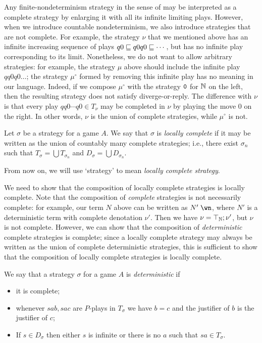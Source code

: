 \documentclass[sigplan,9pt,review]{acmart}\settopmatter{printfolios=true,printccs=false,printacmref=false}
\begin{document}
Any finite-nondeterminism strategy in the sense of \cite{mcCHFiniteND} may be interpreted as a complete strategy by enlarging it with all its infinite limiting plays.  
However, when we introduce countable nondeterminism, we also introduce strategies that are not complete.  
For example, the strategy $\nu$ that we mentioned above has an infinite increasing sequence of plays $q0\sqsubseteq q0q0\sqsubseteq \cdots$, but has no infinite play corresponding to its limit.  
Nonetheless, we do not want to allow arbitrary strategies: for example, the strategy $\mu$ above should include the infinite play $qq0q0\dots$; the strategy $\mu^\circ$ formed by removing this infinite play has no meaning in our language.  
Indeed, if we compose $\mu^\circ$ with the strategy ${\mathtt{0}}$ for $\mathbb{N}$ on the left, then the resulting strategy does not satisfy diverge-or-reply.
The difference with $\nu$ is that every play $qq0\cdots q0\in T_\nu$ may be completed in $\nu$ by playing the move $0$ on the right.
In other words, $\nu$ is the union of complete strategies, while $\mu^\circ$ is not.

\begin{definition}
  Let $\sigma$ be a strategy for a game $A$.  
  We say that $\sigma$ is \emph{locally complete} if it may be written as the union of countably many complete strategies; i.e., there exist $\sigma_n$ such that $T_\sigma=\bigcup T_{\sigma_n}$ and $D_\sigma=\bigcup D_{\sigma_n}$.
\end{definition}

From now on, we will use `strategy' to mean \emph{locally complete strategy}.

We need to show that the composition of locally complete strategies is locally complete.  
Note that the composition of \emph{complete} strategies is not necessarily complete: for example, our term $N$ above can be written as $N'\;\wn$, where $N'$ is a deterministic term with complete denotation $\nu'$.  
Then we have $\nu=\top_{\mathbb{N}};\nu'$, but $\nu$ is not complete.
However, we can show that the composition of \emph{deterministic} complete strategies is complete; since a locally complete strategy may always be written as the union of complete deterministic strategies, this is sufficient to show that the composition of locally complete strategies is locally complete.

\begin{definition}
  We say that a strategy $\sigma$ for a game $A$ is \emph{deterministic} if
  \begin{itemize}
    \item it is complete;
    \item whenever $sab,sac$ are $P$-plays in $T_\sigma$ we have $b=c$ and the justifier of $b$ is the justifier of $c$;
    \item If $s\in D_\sigma$ then either $s$ is infinite or there is no $a$ such that $sa\in T_\sigma$.
  \end{itemize}
\end{definition}
\end{document}

